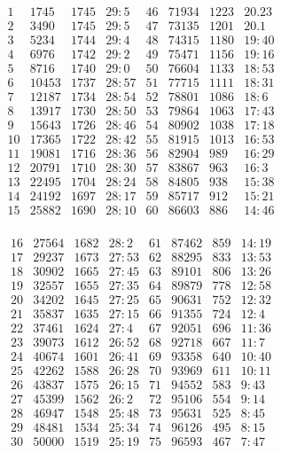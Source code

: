 \documentclass[11pt,a4paper]{article}
\begin{document}
\[
\begin{array}{r|r|r|r||r|r|r|r}
1 & 1745 & 1745 & 29{:}5 & 46 & 71934 & 1223 & 20.23 \\
2 & 3490 & 1745 & 29{:}5 & 47 & 73135 & 1201 & 20.1 \\
3 & 5234 & 1744 & 29{:}4 & 48 & 74315 & 1180 & 19{:}40 \\
4 & 6976 & 1742 & 29{:}2 & 49 & 75471 & 1156 & 19{:}16 \\
5 & 8716 & 1740 & 29{:}0 & 50 & 76604 & 1133 & 18{:}53 \\
\hline
6 & 10453 & 1737 & 28{:}57 & 51 & 77715 & 1111 & 18{:}31 \\
7 & 12187 & 1734 & 28{:}54 & 52 & 78801 & 1086 & 18{:}6 \\
8 & 13917 & 1730 & 28{:}50 & 53 & 79864 & 1063 & 17{:}43 \\
9 & 15643 & 1726 & 28{:}46 & 54 & 80902 & 1038 & 17{:}18 \\
10 & 17365 & 1722 & 28{:}42 & 55 & 81915 & 1013 & 16{:}53 \\
\hline
11 & 19081 & 1716 & 28{:}36 & 56 & 82904 & 989 & 16{:}29 \\
12 & 20791 & 1710 & 28{:}30 & 57 & 83867 & 963 & 16{:}3 \\
13 & 22495 & 1704 & 28{:}24 & 58 & 84805 & 938 & 15{:}38 \\
14 & 24192 & 1697 & 28{:}17 & 59 & 85717 & 912 & 15{:}21 \\
15 & 25882 & 1690 & 28{:}10 & 60 & 86603 & 886 & 14{:}46 \\
\end{array}
\]

\[
\begin{array}{r|r|r|r||r|r|r|r}
16 & 27564 & 1682 & 28{:}2 & 61 & 87462 & 859 & 14{:}19 \\
17 & 29237 & 1673 & 27{:}53 & 62 & 88295 & 833 & 13{:}53 \\
18 & 30902 & 1665 & 27{:}45 & 63 & 89101 & 806 & 13{:}26 \\
19 & 32557 & 1655 & 27{:}35 & 64 & 89879 & 778 & 12{:}58 \\
20 & 34202 & 1645 & 27{:}25 & 65 & 90631 & 752 & 12{:}32 \\
\hline
21 & 35837 & 1635 & 27{:}15 & 66 & 91355 & 724 & 12{:}4 \\
22 & 37461 & 1624 & 27{:}4 & 67 & 92051 & 696 & 11{:}36 \\
23 & 39073 & 1612 & 26{:}52 & 68 & 92718 & 667 & 11{:}7 \\
24 & 40674 & 1601 & 26{:}41 & 69 & 93358 & 640 & 10{:}40 \\
25 & 42262 & 1588 & 26{:}28 & 70 & 93969 & 611 & 10{:}11 \\
\hline
26 & 43837 & 1575 & 26{:}15 & 71 & 94552 & 583 & 9{:}43 \\
27 & 45399 & 1562 & 26{:}2 & 72 & 95106 & 554 & 9{:}14 \\
28 & 46947 & 1548 & 25{:}48 & 73 & 95631 & 525 & 8{:}45 \\
29 & 48481 & 1534 & 25{:}34 & 74 & 96126 & 495 & 8{:}15 \\
30 & 50000 & 1519 & 25{:}19 & 75 & 96593 & 467 & 7{:}47 \\
\end{array}
\]
\end{document}
